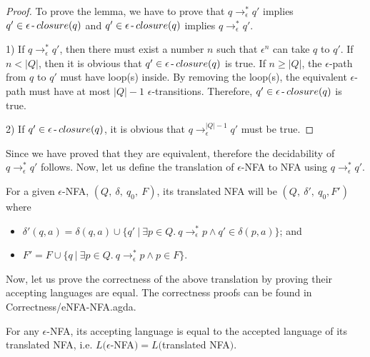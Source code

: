 \begin{proof}
\noindent To prove the lemma, we have to prove that \(q \to_\epsilon^*
q'\) implies \(q' \in \epsilon\operatorname{-} closure(q)\) and \(q' \in
\epsilon\operatorname{-} closure(q)\) implies \(q \to_\epsilon^* q'\). 

\par 1) If \(q \to_\epsilon^* q'\), then there must exist a
number \(n\) such that \(\epsilon^n\) can take \(q\) to \(q'\). If
\(n < |Q|\), then it is obvious that \(q' \in
\epsilon\operatorname{-} closure(q)\) is true. If \(n \geq |Q|\), the
\(\epsilon\)-path from \(q\) to \(q'\) must have loop(s) inside. By
removing the loop(s), the equivalent \(\epsilon\)-path must have at
most \(|Q|-1\) \(\epsilon\)-transitions. Therefore, \(q' \in
\epsilon\operatorname{-} closure(q)\) is true. 

\par 2) If \(q' \in \epsilon\operatorname{-} closure(q)\), it is obvious
that \(q \to_\epsilon^{|Q|-1} q'\) must be true. 
\end{proof}

\par Since we have proved that they are equivalent, therefore the
decidability of \(q \to_\epsilon^* q'\) follows. Now, let us define
the translation of \(\epsilon\)-NFA to NFA using \(q \to_\epsilon^* q'\). 
 
\begin{defn}
\label{defn:remove_epsilon}
\noindent For a given \(\epsilon\)-NFA, \((Q,\ \delta,\
q_0,\ F)\), its translated NFA will be \((Q,\ \delta',\ q_0,
F')\) where
\begin{itemize}[nolistsep]
  \item \(\delta'(q,a) = \delta (q,a) \cup \{q'\ |\ \exists p\in Q.\
      q \to_\epsilon^* p \wedge q' \in \delta (p,a)\}\); and
  \item \(F' = F \cup \{q\ |\ \exists p\in Q.\ q \to_\epsilon^* p \wedge p
      \in F\} \). 
\end{itemize}
\end{defn}

\par Now, let us prove the correctness of the above translation by proving their accepting languages
are equal. The correctness proofs can be found in Correctness/eNFA-NFA.agda.

\begin{thm}
\noindent For any \(\epsilon\)-NFA, its accepting language is equal to
the accepted language of its translated NFA, i.e. \(L(\epsilon\)-NFA\()
= L(\)translated NFA\()\). 
\end{thm}


